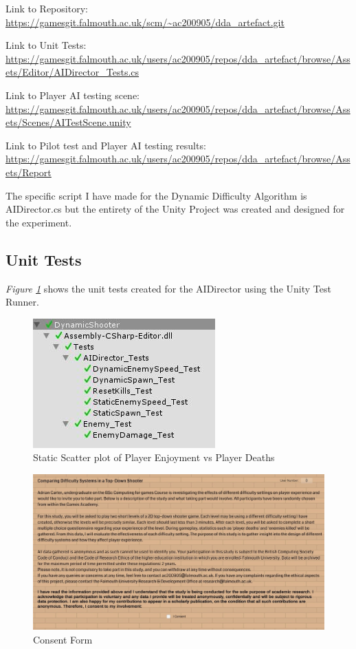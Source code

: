 \documentclass[journal]{IEEEtran}
\begin{document}
Link to Repository:
\url{https://gamesgit.falmouth.ac.uk/scm/~ac200905/dda_artefact.git}

Link to Unit Tests:
\url{https://gamesgit.falmouth.ac.uk/users/ac200905/repos/dda_artefact/browse/Assets/Editor/AIDirector_Tests.cs}

Link to Player AI testing scene:
\url{https://gamesgit.falmouth.ac.uk/users/ac200905/repos/dda_artefact/browse/Assets/Scenes/AITestScene.unity}

Link to Pilot test and Player AI testing results:
\url{https://gamesgit.falmouth.ac.uk/users/ac200905/repos/dda_artefact/browse/Assets/Report}

The specific script I have made for the Dynamic Difficulty Algorithm is AIDirector.cs but the entirety of the Unity Project was created and designed for the experiment.

\subsection{Unit Tests}
\textit{Figure \ref{fig::8}} shows the unit tests created for the AIDirector using the Unity Test Runner.

\begin{figure}[h]
	\includegraphics[width=1.0\linewidth]{unittests.jpg}
	\caption{Static Scatter plot of Player Enjoyment vs Player Deaths}
	\label{fig::8}
\end{figure}

\begin{figure}[h]
	\includegraphics[width=0.75\linewidth]{consentformingame.jpg}
	\caption{Consent Form}
	\label{fig::9}
\end{figure} 
\end{document}
